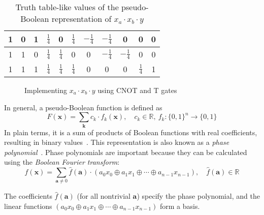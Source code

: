\documentclass[a4paper]{article}
\begin{document}
\begin{table*}[h]
\begin{minipage}{\textwidth}
\begin{center}
{\begin{tabular}{c|c|c|c|c|c|c|c|c|c|c}
          1     & 0     & 1   & $\frac{1}{4}$     & 0                 & $\frac{1}{4}$   & $-\frac{1}{4}$       & $-\frac{1}{4}$     & 0                  & 0                             & 0            \\\hline
          1     & 1     & 0   & $\frac{1}{4}$     & $\frac{1}{4}$     & 0               & 0                    & $-\frac{1}{4}$     & $-\frac{1}{4}$     & 0                             & 0            \\\hline
          1     & 1     & 1   & $\frac{1}{4}$     & $\frac{1}{4}$     & $\frac{1}{4}$   & 0                    & 0                  & 0                  & $\frac{1}{4}$                 & 1            \\\hline
        \end{tabular}
      }
      \caption{Truth table-like values of the pseudo-Boolean representation of $x_a \cdot x_b \cdot y$}
      \label{table-pseudo-toff}
    \end{center}
  \end{minipage}
\end{table*}
\begin{figure}[t]
  \centering
  \scalebox{0.7} {
    
  }
  \caption{Implementing $x_a \cdot x_b \cdot y$ using CNOT and T gates}
  \label{fig-toff-mark}
\end{figure}

In general, a pseudo-Boolean function is defined as
\begin{equation}
  \label{eq-pseudo-boolean}
  F(\mathbf{x}) = \sum_{\mathbf{k}} c_k \cdot f_k(\mathbf{x}), \quad c_k \in \mathbb{R},\ f_k : \{0,1\}^n \to \{0,1\}
\end{equation}
In plain terms, it is a sum of products of Boolean functions with real coefficients, resulting in binary values~\cite{bib-barenco-elementary}. This representation is also known as a {\it phase polynomial}~\cite{bib-amy-cnot}.
\vspace{1cm}
Phase polynomials are important because they can be calculated using the {\it Boolean Fourier transform}:
\begin{equation}
  \label{eq-boolean-fourier}
  f(\mathbf{x}) = \sum_{\mathbf{a} \neq 0} \hat{f}(\mathbf{a}) \cdot ( a_0 x_0 \oplus a_1 x_1 \oplus \cdots \oplus a_{n-1} x_{n-1}), \quad \hat{f}(\mathbf{a}) \in \mathbb{R}
\end{equation}

The coefficients $\hat{f}(\mathbf{a})$ (for all nontrivial $\mathbf{a}$) specify the phase polynomial, and the linear functions $( a_0 x_0 \oplus a_1 x_1 \oplus \cdots \oplus a_{n-1} x_{n-1})$ form a basis.
\end{document}
